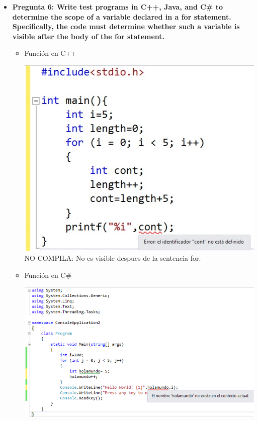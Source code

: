 \documentclass[12pt,oneside]{article}
\begin{document}
\begin{itemize}
				\item {\bf Pregunta 6: Write test programs in C++, Java, and C\# to determine the scope of a variable declared in a for statement. Specifically, the code must determine whether such a variable is visible after the body of the for statement.}
					\begin{itemize}
						\item {Función en C++}
							\begin{center}
								\includegraphics[scale=0.6]{Imagenes/3.jpg}\\
								NO COMPILA: No es visible despues de la sentencia for.
							\end{center}
						\item {Función en C\#}
							\begin{center}
								\includegraphics[scale=0.7]{Imagenes/4.jpg}\\

\end{center}
\end{itemize}
\end{itemize}
\end{document}

